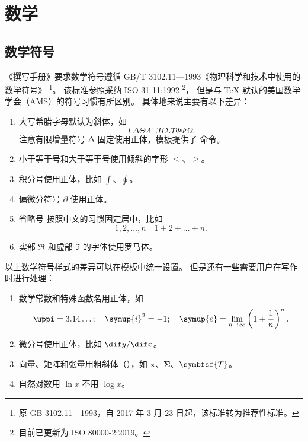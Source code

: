 
\chapter{数学}

\section{数学符号}

《撰写手册》要求数学符号遵循 GB/T 3102.11—1993《物理科学和技术中使用的数学符号》
\footnote{原 GB 3102.11—1993，自 2017 年 3 月 23 日起，该标准转为推荐性标准。}。
该标准参照采纳 ISO 31-11:1992 \footnote{目前已更新为 ISO 80000-2:2019。}，
但是与 \TeX{} 默认的美国数学学会（AMS）的符号习惯有所区别。
具体地来说主要有以下差异：
\begin{enumerate}
  \item 大写希腊字母默认为斜体，如
    \begin{equation*}
      \Gamma \Delta \Theta \Lambda \Xi \Pi \Sigma \Upsilon \Phi \Psi \Omega.
    \end{equation*}
    注意有限增量符号 $\increment$ 固定使用正体，模板提供了  命令。
  \item 小于等于号和大于等于号使用倾斜的字形 $\le$、$\ge$。
  \item 积分号使用正体，比如 $\int$、$\oint$。
  \item
    偏微分符号 $\partial$ 使用正体。
  \item
    省略号  按照中文的习惯固定居中，比如
    \begin{equation*}
      1, 2, \dots, n \quad 1 + 2 + \dots + n.
    \end{equation*}
  \item
    实部 $\Re$ 和虚部 $\Im$ 的字体使用罗马体。
\end{enumerate}

以上数学符号样式的差异可以在模板中统一设置。
但是还有一些需要用户在写作时进行处理：
\begin{enumerate}
  \item 数学常数和特殊函数名用正体，如
    \begin{equation*}
      \uppi = 3.14\dots; \quad
      \symup{i}^2 = -1; \quad
      \symup{e} = \lim_{n \to \infty} \left( 1 + \frac{1}{n} \right)^n.
    \end{equation*}
  \item 微分号使用正体，比如 $\dif y / \dif x$。
  \item 向量、矩阵和张量用粗斜体（），如 $\symbf{x}$、$\symbf{\Sigma}$、$\symbfsf{T}$。
  \item 自然对数用 $\ln x$ 不用 $\log x$。
\end{enumerate}

